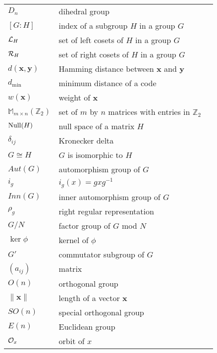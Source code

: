 \begin{center}
\begin{longtable}{llr}
%
$D_n$ & dihedral group & \pageref{dihedralgroup} \\
%
$[G:H]$ & index of a subgroup $H$ in a group $G$ & \pageref{indexofasubgroup}  \\
%
${\cal L}_H$ & set of left cosets of $H$ in a group $G$ & \pageref{notesetleft} \\
%
${\cal R}_H$ & set of right cosets of $H$ in a group $G$ & \pageref{notesetright}  \\
%
$d({\mathbf x}, {\mathbf y})$ & Hamming distance between ${\mathbf x}$ and ${\mathbf y}$ & \pageref{noteHammingdist} \\
%
$d_{\min}$ & minimum distance of a code & \pageref{notemindist}\\
%
$w({\mathbf x})$ & weight of ${\mathbf x}$ & \pageref{noteweight} \\
%
${\mathbb M}_{m \times n}({\mathbb Z}_2)$ & set of $m$ by $n$ matrices with entries in ${\mathbb Z}_2$ & \pageref{notembyn} \\
%
${\rm Null}(H)$ & null space of a matrix $H$ & \pageref{notenull} \\
%
$\delta_{ij}$ & Kronecker delta & \pageref{notekron} \\
%
$G \cong H$ & $G$ is isomorphic to $H$ & \pageref{noteisomorph} \\
%
$Aut(G)$ & automorphism group of $G$ & \pageref{noteauto} \\
%
$i_g$ & $i_g(x) = gxg^{-1}$ & \pageref{noteinner} \\
%
$Inn(G)$ & inner automorphism group of $G$ & \pageref{noteinneraut} \\
%
$\rho_g$ & right regular representation & \pageref{noterightreg} \\
%
$G/N$ & factor group of $G$ mod $N$ & \pageref{notefactor} \\
%
$\ker \phi$ & kernel of $\phi$ & \pageref{kernelofphi} \\
%
$G'$ & commutator subgroup of $G$ & \pageref{commutatorsubgroup} \\
%
$(a_{ij})$ & matrix & \pageref{matrixnote} \\
%
$O(n)$ & orthogonal group & \pageref{noteorthogonal} \\
%
$\| {\mathbf x} \|$ & length of a vector ${\mathbf x}$ & \pageref{notelengthvect} \\
%
$SO(n)$ & special orthogonal group & \pageref{notespecialorthog} \\
%
$E(n)$ & Euclidean group & \pageref{noteeuclidgroup} \\
%
${\cal O}_x$ & orbit of $x$ & \pageref{noteorbit} \\

\end{longtable}
\end{center}
